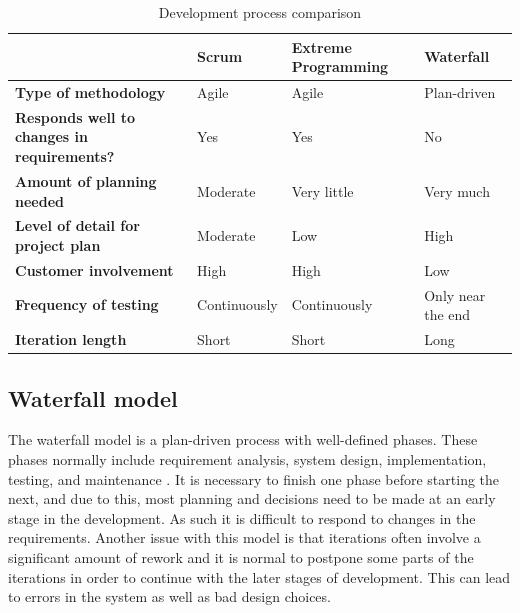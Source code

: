 \begin{table}[!h]
	\caption{Development process comparison}
	\small
	\begin{adjustbox}{center}
		\begin{tabular}{ | l | l | l | l |}
			\hline
			\textbf{} & \textbf{Scrum} & \textbf{Extreme Programming} & \textbf{Waterfall} \\ \hline
			\textbf{Type of methodology} & Agile & Agile & Plan-driven \\ \hline
			\textbf{Responds well to changes in requirements?} & Yes & Yes & No \\ \hline
			\textbf{Amount of planning needed} & Moderate & Very little & Very much \\ \hline
			\textbf{Level of detail for project plan} & Moderate & Low & High \\ \hline
			\textbf{Customer involvement} & High & High & Low \\ \hline
			\textbf{Frequency of testing} & Continuously & Continuously & Only near the end \\ \hline
			\textbf{Iteration length} & Short & Short & Long \\ \hline
		\end{tabular}
	\end{adjustbox}
	\label{Tab:dev-process}	
\end{table}


\subsection{Waterfall model}
The waterfall model is a plan-driven process with well-defined phases. These phases normally include requirement analysis, system design, implementation, testing, and maintenance \cite[p.30-32]{Sommerville}. It is necessary to finish one phase before starting the next, and due to this, most planning and decisions need to be made at an early stage in the development. As such it is difficult to respond to changes in the requirements. Another issue with this model is that iterations often involve a significant amount of rework and it is normal to postpone some parts of the iterations in order to continue with the later stages of development. This can lead to errors in the system as well as bad design choices.


